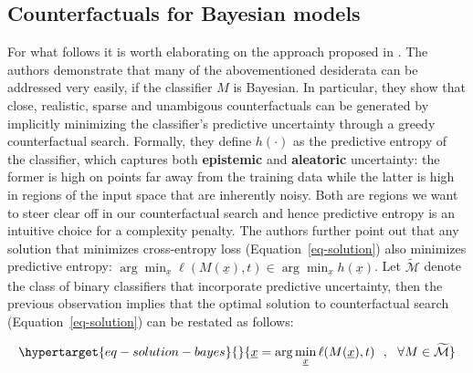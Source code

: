 \documentclass[
  letterpaper,
  DIV=11,
  numbers=noendperiod]{scrartcl}
\begin{document}
\hypertarget{counterfactuals-for-bayesian-models}{%
\subsection{Counterfactuals for Bayesian
models}\label{counterfactuals-for-bayesian-models}}

For what follows it is worth elaborating on the approach proposed in
\cite{schut2021generating}. The authors demonstrate that many of the
abovementioned desiderata can be addressed very easily, if the
classifier \(M\) is Bayesian. In particular, they show that close,
realistic, sparse and unambigous counterfactuals can be generated by
implicitly minimizing the classifier's predictive uncertainty through a
greedy counterfactual search. Formally, they define \(h(\cdot)\) as the
predictive entropy of the classifier, which captures both
\textbf{epistemic} and \textbf{aleatoric} uncertainty: the former is
high on points far away from the training data while the latter is high
in regions of the input space that are inherently noisy. Both are
regions we want to steer clear off in our counterfactual search and
hence predictive entropy is an intuitive choice for a complexity
penalty. The authors further point out that any solution that minimizes
cross-entropy loss (Equation~\ref{eq-solution}) also minimizes
predictive entropy:
\(\arg \min _{\underline{x}} \ell(M(\underline{x}),t) \in \arg \min _{\underline{x}} h(\underline{x})\).
Let \(\mathcal{\widetilde{M}}\) denote the class of binary classifiers
that incorporate predictive uncertainty, then the previous observation
implies that the optimal solution to counterfactual search
(Equation~\ref{eq-solution}) can be restated as follows:

\begin{equation}\protect\hypertarget{eq-solution-bayes}{}{
\underline{x} = \arg \min_{\underline{x}}  \ell(M(\underline{x}),t) \ \ , \ \  \forall M\in\mathcal{\widetilde{M}}
}\label{eq-solution-bayes}\end{equation}
\end{document}
